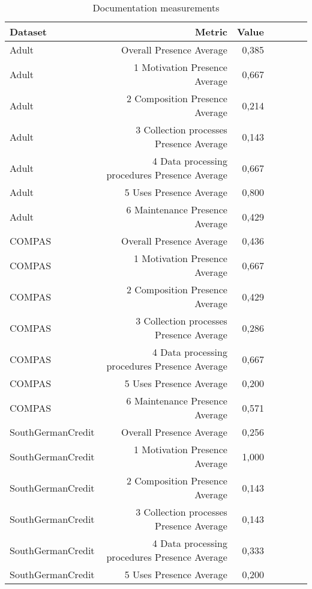 \begin{table}[t]
\caption{Documentation measurements}
\label{tab:dts_all}
\begin{tabular}{|p{2cm}|r|r|r|r|r|r|}
\hline
Dataset & Metric & Value \\
\hline
Adult & Overall Presence Average & 0,385\cellcolor[HTML]{FCB096}\\
Adult & 1 Motivation Presence Average & 0,667\cellcolor[HTML]{FDC6B2}\\
Adult & 2 Composition Presence Average & 0,214\cellcolor[HTML]{FCA286}\\
Adult & 3 Collection processes Presence Average & 0,143\cellcolor[HTML]{FC9D7F}\\
Adult & 4 Data processing procedures Presence Average & 0,667\cellcolor[HTML]{FDC6B2}\\
Adult & 5 Uses Presence Average & 0,800\cellcolor[HTML]{FDD0BE}\\
Adult & 6 Maintenance Presence Average & 0,429\cellcolor[HTML]{FCB39B}\\
COMPAS & Overall Presence Average & 0,436\cellcolor[HTML]{FCB49B}\\
COMPAS & 1 Motivation Presence Average & 0,667\cellcolor[HTML]{FDC6B2}\\
COMPAS & 2 Composition Presence Average & 0,429\cellcolor[HTML]{FCB39B}\\
COMPAS & 3 Collection processes Presence Average & 0,286\cellcolor[HTML]{FCA88D}\\
COMPAS & 4 Data processing procedures Presence Average & 0,667\cellcolor[HTML]{FDC6B2}\\
COMPAS & 5 Uses Presence Average & 0,200\cellcolor[HTML]{FCA185}\\
COMPAS & 6 Maintenance Presence Average & 0,571\cellcolor[HTML]{FDBEA8}\\
SouthGermanCredit & Overall Presence Average & 0,256\cellcolor[HTML]{FCA58A}\\
SouthGermanCredit & 1 Motivation Presence Average & 1,000\cellcolor[HTML]{FEE0D2}\\
SouthGermanCredit & 2 Composition Presence Average & 0,143\cellcolor[HTML]{FC9D7F}\\
SouthGermanCredit & 3 Collection processes Presence Average & 0,143\cellcolor[HTML]{FC9D7F}\\
SouthGermanCredit & 4 Data processing procedures Presence Average & 0,333\cellcolor[HTML]{FCAB91}\\
SouthGermanCredit & 5 Uses Presence Average & 0,200\cellcolor[HTML]{FCA185}\\

\end{tabular}
\end{table}
